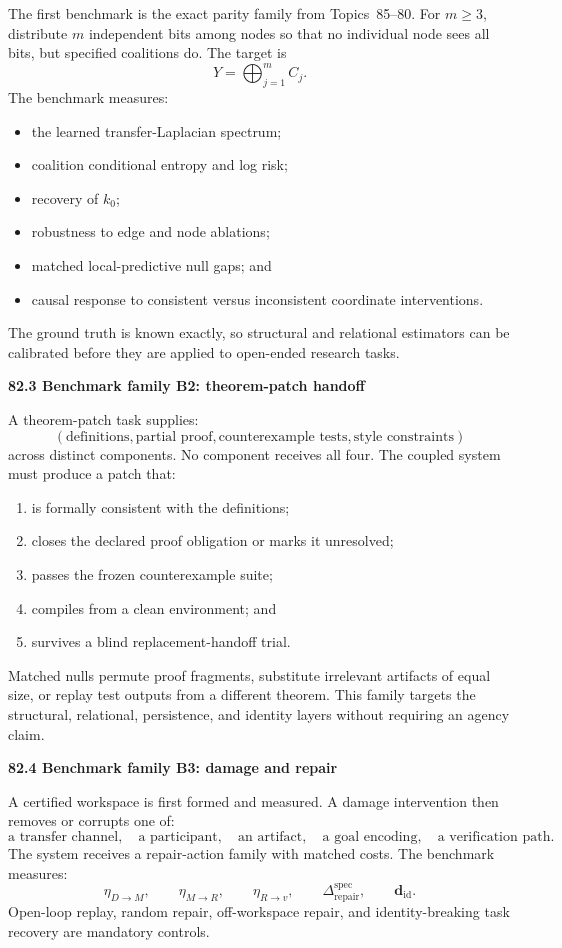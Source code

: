 \documentclass[11pt,letterpaper]{article}
\newcommand{\subtopic}[1]{%
 \vspace{0.45em}
 {\bfseries\color{AccentColor} #1\par}
}
\theoremstyle{plain}
\theoremstyle{definition}
\begin{document}
The first benchmark is the exact parity family from Topics~85--80. For
\(m\geq3\), distribute \(m\) independent bits among nodes so that no individual
node sees all bits, but specified coalitions do. The target is
\[
Y=\bigoplus_{j=1}^m C_j.
\]
The benchmark measures:
\begin{itemize}
\item the learned transfer-Laplacian spectrum;
\item coalition conditional entropy and log risk;
\item recovery of \(k_0\);
\item robustness to edge and node ablations;
\item matched local-predictive null gaps; and
\item causal response to consistent versus inconsistent coordinate
 interventions.
\end{itemize}
The ground truth is known exactly, so structural and relational estimators can
be calibrated before they are applied to open-ended research tasks.

\subtopic{82.3 Benchmark family B2: theorem-patch handoff}

A theorem-patch task supplies:
\[
\left(
\text{definitions},
\text{partial proof},
\text{counterexample tests},
\text{style constraints}
\right)
\]
across distinct components. No component receives all four. The coupled
system must produce a patch that:
\begin{enumerate}
\item is formally consistent with the definitions;
\item closes the declared proof obligation or marks it unresolved;
\item passes the frozen counterexample suite;
\item compiles from a clean environment; and
\item survives a blind replacement-handoff trial.
\end{enumerate}
Matched nulls permute proof fragments, substitute irrelevant artifacts of equal
size, or replay test outputs from a different theorem. This family targets the
structural, relational, persistence, and identity layers without requiring an
agency claim.

\subtopic{82.4 Benchmark family B3: damage and repair}

A certified workspace is first formed and measured. A damage intervention then
removes or corrupts one of:
\[
\text{a transfer channel},
\quad
\text{a participant},
\quad
\text{an artifact},
\quad
\text{a goal encoding},
\quad
\text{a verification path}.
\]
The system receives a repair-action family with matched costs. The benchmark
measures:
\[
\eta_{D\to M},
\qquad
\eta_{M\to R},
\qquad
\eta_{R\to v},
\qquad
\Delta_{\mathrm{repair}}^{\mathrm{spec}},
\qquad
\mathbf d_{\mathrm{id}}.
\]
Open-loop replay, random repair, off-workspace repair, and identity-breaking
task recovery are mandatory controls.
\end{document}
